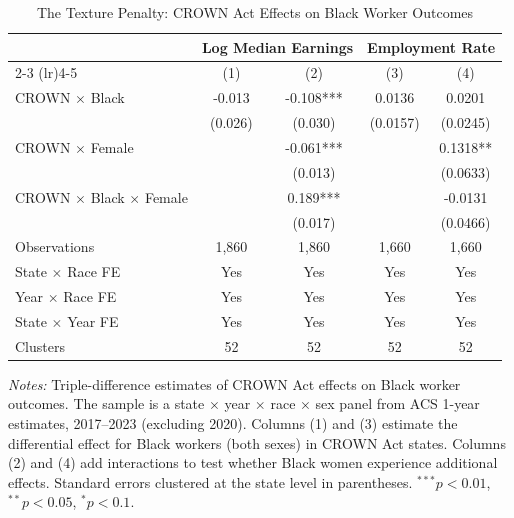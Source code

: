 \begin{table}[htbp]
\centering
\caption{The Texture Penalty: CROWN Act Effects on Black Worker Outcomes}
\label{tab:main}
\small
\begin{tabular}{lcccc}
\toprule
 & \multicolumn{2}{c}{Log Median Earnings} & \multicolumn{2}{c}{Employment Rate} \\
\cmidrule(lr){2-3} \cmidrule(lr){4-5}
 & (1) & (2) & (3) & (4) \\
\midrule
CROWN $\times$ Black & -0.013 & -0.108*** & 0.0136 & 0.0201 \\
 & (0.026) & (0.030) & (0.0157) & (0.0245) \\
CROWN $\times$ Female & & -0.061*** & & 0.1318** \\
 & & (0.013) & & (0.0633) \\
CROWN $\times$ Black $\times$ Female & & 0.189*** & & -0.0131 \\
 & & (0.017) & & (0.0466) \\
\midrule
Observations & 1,860 & 1,860 & 1,660 & 1,660 \\
State $\times$ Race FE & Yes & Yes & Yes & Yes \\
Year $\times$ Race FE & Yes & Yes & Yes & Yes \\
State $\times$ Year FE & Yes & Yes & Yes & Yes \\
Clusters & 52 & 52 & 52 & 52 \\
\bottomrule
\end{tabular}
\begin{tablenotes}
\item \textit{Notes:} Triple-difference estimates of CROWN Act effects on Black worker outcomes. The sample is a state $\times$ year $\times$ race $\times$ sex panel from ACS 1-year estimates, 2017--2023 (excluding 2020). Columns (1) and (3) estimate the differential effect for Black workers (both sexes) in CROWN Act states. Columns (2) and (4) add interactions to test whether Black women experience additional effects. Standard errors clustered at the state level in parentheses. $^{***}p<0.01$, $^{**}p<0.05$, $^{*}p<0.1$.
\end{tablenotes}
\end{table}
